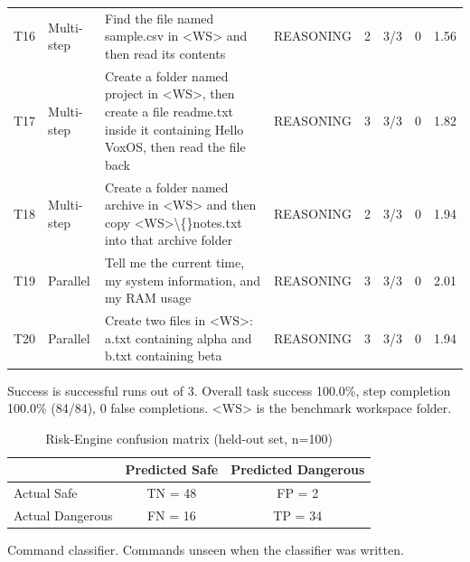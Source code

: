 \begin{table}[htbp]
\begin{tabular}{llp{3.2cm}lcccc}
T16 & Multi-step & Find the file named sample.csv in \textless{}WS\textgreater{} and then read its contents & REASONING & 2 & 3/3 & 0 & 1.56 \\
T17 & Multi-step & Create a folder named project in \textless{}WS\textgreater{}, then create a file readme.txt inside it containing Hello VoxOS, then read the file back & REASONING & 3 & 3/3 & 0 & 1.82 \\
T18 & Multi-step & Create a folder named archive in \textless{}WS\textgreater{} and then copy \textless{}WS\textgreater{}\textbackslash\{\}notes.txt into that archive folder & REASONING & 2 & 3/3 & 0 & 1.94 \\
T19 & Parallel & Tell me the current time, my system information, and my RAM usage & REASONING & 3 & 3/3 & 0 & 2.01 \\
T20 & Parallel & Create two files in \textless{}WS\textgreater{}: a.txt containing alpha and b.txt containing beta & REASONING & 3 & 3/3 & 0 & 1.94 \\
\hline
\end{tabular}
\vspace{2pt}\footnotesize Success is successful runs out of 3. Overall task success 100.0\%, step completion 100.0\% (84/84), 0 false completions. \textless{}WS\textgreater{} is the benchmark workspace folder.
\end{table}

\begin{table}[htbp]
\caption{Risk-Engine confusion matrix (held-out set, n=100)}
\label{tab:tableVII_confusion}
\centering
\begin{tabular}{lcc}
\hline
\textbf{} & \textbf{Predicted Safe} & \textbf{Predicted Dangerous} \\
\hline
Actual Safe & TN = 48 & FP = 2 \\
Actual Dangerous & FN = 16 & TP = 34 \\
\hline
\end{tabular}
\vspace{2pt}\footnotesize Command classifier. Commands unseen when the classifier was written.
\end{table}

